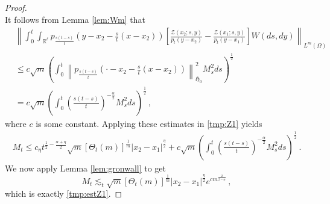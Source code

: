 \documentclass[12pt,reqno]{amsart}
\theoremstyle{remark}
\newcommand{\1}{\mathbf{1}}
\def\RR{\mathbb{R}}
\def\HH{\mathfrak{H}}
\def\Z{\mathcal{Z}}
\def\lt{\left}
\def\rt{\right}
\def\HH{\mathfrak{H}}
\begin{document}
\begin{proof}
\begin{equation*}
		\end{equation*}
		It follows from Lemma \ref{lem:Wm} that
		\begin{align*}
			&\lt\|\int_0^t\int_{\RR^\ell}p_{\frac{s(t-s)}t}\lt(y-x_2-\frac st(x-x_2) \rt)
			\lt[\frac{\Z(x_2;s,y)}{p_t(y-x_2)}-\frac{\Z(x_1;s,y)}{p_t(y-x_1)}\rt]W(ds,dy)\rt\|_{L^m(\Omega)}
			\\&\le c \sqrt{m}\lt( \int_0^t \lt\|p_{\frac{s(t-s)}t}\lt(\cdot-x_2-\frac st(x-x_2) \rt)\rt\|^2_{\HH_{0}}M_s^2ds\rt)^{\frac12}
			\\&=c\sqrt{m}\lt(\int_0^t \lt(\frac{s(t-s)}t \rt)^{-\frac \alpha2}M_s^2 ds \rt)^{\frac12}\,,
		\end{align*}
		where $c$ is some constant. Applying these estimates in \eqref{tmp:Z1} yields
		\begin{align*}
			M_t\le c_ \eta t^{\frac12-\frac{\alpha+\eta}2} \sqrt m[\Theta_t(m)]^{\frac1m}|x_2-x_1|^{\frac\eta2}+c\sqrt{m}\lt(\int_0^t \lt(\frac{s(t-s)}t \rt)^{-\frac \alpha2}M_s^2 ds \rt)^{\frac12}\,.
		\end{align*}
		We now apply Lemma \ref{lem:gronwall} to get
		\begin{equation*}
		 	M_t\lesssim_t \sqrt m[\Theta_t(m)]^{\frac1m}|x_2-x_1|^{\frac\eta2}e^{c m^{\frac{2}{2-\alpha}}}\,,
		\end{equation*} 
		which is exactly \eqref{tmp:estZ1}.
		

\end{proof}
\end{document}
